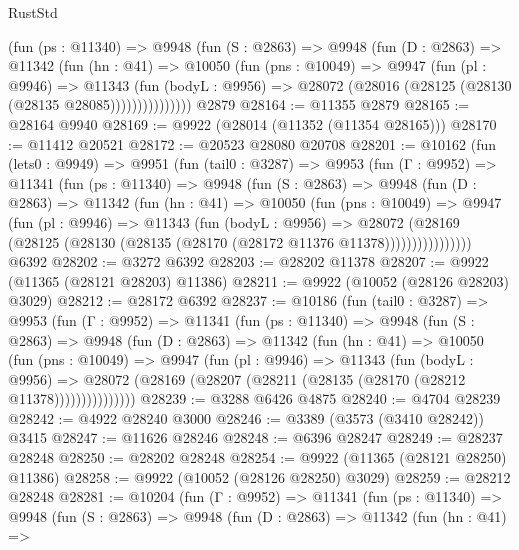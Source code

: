 \begin{lexlean}{RustStd}
\begin{coremodule}
            (fun (ps : @11340) =>
            @9948
              (fun (S : @2863) =>
              @9948
                (fun (D : @2863) =>
                @11342
                  (fun (hn : @41) =>
                  @10050
                    (fun (pns : @10049) =>
                    @9947
                      (fun (pl : @9946) =>
                      @11343
                        (fun (bodyL : @9956) =>
                        @28072 (@28016 (@28125 (@28130 (@28135 @28085)))))))))))))))
    @2879
@28164 := @11355 @2879
@28165 := @28164 @9940
@28169 := @9922 (@28014 (@11352 (@11354 @28165)))
@28170 := @11412 @20521
@28172 := @20523 @28080 @20708
@28201 := @10162
    (fun (lets0 : @9949) =>
    @9951
      (fun (tail0 : @3287) =>
      @9953
        (fun (Γ : @9952) =>
        @11341
          (fun (ps : @11340) =>
          @9948
            (fun (S : @2863) =>
            @9948
              (fun (D : @2863) =>
              @11342
                (fun (hn : @41) =>
                @10050
                  (fun (pns : @10049) =>
                  @9947
                    (fun (pl : @9946) =>
                    @11343
                      (fun (bodyL : @9956) =>
                      @28072
                        (@28169
                          (@28125 (@28130 (@28135 (@28170 (@28172 @11376 @11378))))))))))))))))
    @6392
@28202 := @3272 @6392
@28203 := @28202 @11378
@28207 := @9922 (@11365 (@28121 @28203) @11386)
@28211 := @9922 (@10052 (@28126 @28203) @3029)
@28212 := @28172 @6392
@28237 := @10186
    (fun (tail0 : @3287) =>
    @9953
      (fun (Γ : @9952) =>
      @11341
        (fun (ps : @11340) =>
        @9948
          (fun (S : @2863) =>
          @9948
            (fun (D : @2863) =>
            @11342
              (fun (hn : @41) =>
              @10050
                (fun (pns : @10049) =>
                @9947
                  (fun (pl : @9946) =>
                  @11343
                    (fun (bodyL : @9956) =>
                    @28072 (@28169 (@28207 (@28211 (@28135 (@28170 (@28212 @11378)))))))))))))))
@28239 := @3288 @6426 @4875
@28240 := @4704 @28239
@28242 := @4922 @28240 @3000
@28246 := @3389 (@3573 (@3410 @28242)) @3415
@28247 := @11626 @28246
@28248 := @6396 @28247
@28249 := @28237 @28248
@28250 := @28202 @28248
@28254 := @9922 (@11365 (@28121 @28250) @11386)
@28258 := @9922 (@10052 (@28126 @28250) @3029)
@28259 := @28212 @28248
@28281 := @10204
    (fun (Γ : @9952) =>
    @11341
      (fun (ps : @11340) =>
      @9948
        (fun (S : @2863) =>
        @9948
          (fun (D : @2863) =>
          @11342
            (fun (hn : @41) =>

\end{coremodule}
\end{lexlean}

